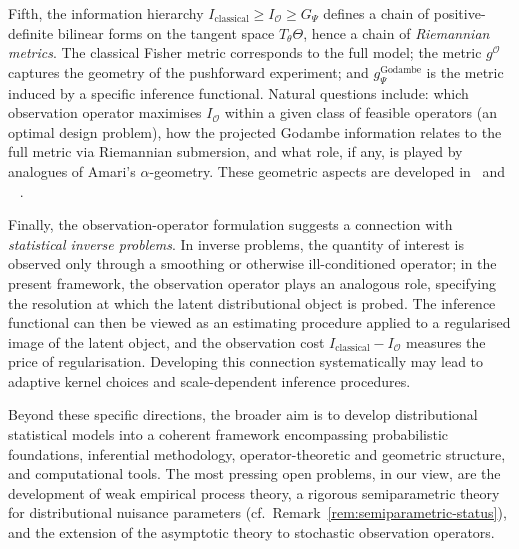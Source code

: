 \documentclass[11pt,a4paper]{article}
\begin{document}
Fifth, the information hierarchy
$I_{\mathrm{classical}} \geq I_{\mathcal O} \geq G_\Psi$ defines a chain
of positive-definite bilinear forms on the tangent space
$T_\theta\Theta$, hence a chain of \emph{Riemannian metrics}.  The
classical Fisher metric corresponds to the full model; the metric
$g^{\mathcal O}$ captures the geometry of the pushforward experiment; and
$g^{\mathrm{Godambe}}_\Psi$ is the metric induced by a specific inference
functional.  Natural questions include: which observation operator
maximises $I_{\mathcal O}$ within a given class of feasible operators (an
optimal design problem), how the projected Godambe information relates to
the full metric via Riemannian submersion, and what role, if any, is
played by analogues of Amari's $\alpha$-geometry.  These geometric aspects
are developed in~\cite{LabouriauE} and ~\cite{LabouriauZ} .

Finally, the observation-operator formulation suggests a connection with
\emph{statistical inverse problems}.  In inverse problems, the quantity of
interest is observed only through a smoothing or otherwise ill-conditioned
operator; in the present framework, the observation operator plays an
analogous role, specifying the resolution at which the latent distributional
object is probed.  The inference functional can then be viewed as an
estimating procedure applied to a regularised image of the latent object,
and the observation cost $I_{\mathrm{classical}} - I_{\mathcal O}$
measures the price of regularisation.  Developing this connection
systematically may lead to adaptive kernel choices and scale-dependent
inference procedures.

Beyond these specific directions, the broader aim is to develop
distributional statistical models into a coherent framework encompassing
probabilistic foundations, inferential methodology, operator-theoretic and
geometric structure, and computational tools.  The most pressing open
problems, in our view, are the development of weak empirical process
theory, a rigorous semiparametric theory for distributional nuisance
parameters (cf.\ Remark~\ref{rem:semiparametric-status}), and the
extension of the asymptotic theory to stochastic observation operators.
\end{document}
